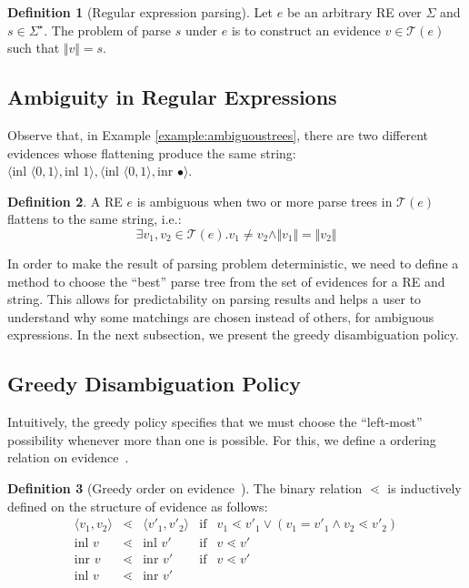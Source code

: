 \documentclass[oneside,12pt]{scrbook}
\theoremstyle{definition}
\theoremstyle{plain}
\theoremstyle{definition}
\newtheorem{Definition}{Definition}
\begin{document}
\begin{Definition}[Regular expression parsing]
   Let $e$ be an arbitrary RE over $\Sigma$ and $s \in \Sigma^\star$. The problem of
   parse $s$ under $e$ is to construct an evidence $v \in \mathcal{T}(e)$ such that
   $\Vert v \Vert = s$.
\end{Definition} 


\subsection{Ambiguity in Regular Expressions}\label{subsection:ambiguity}

Observe that, in Example \ref{example:ambiguoustrees}, there are two different evidences
whose flattening produce the same string:
$\langle \text{inl }\langle 0, 1 \rangle, \text{inl }1 \rangle,\langle \text{inl }\langle 0, 1 \rangle, \text{inr }\bullet \rangle$.

\begin{Definition}
   A RE $e$ is ambiguous when two or more parse trees in $\mathcal{T}(e)$ flattens to the same string, i.e.:
   \[
    \exists v_1, v_2 \in \mathcal{T}(e). v_1 \neq v_2 \land \Vert v_1 \Vert = \Vert v_2 \Vert
   \]
\end{Definition}

In order to make the result of parsing problem deterministic, we need to define a
method to choose the ``best'' parse tree from the set of evidences for a RE and string.
This allows for predictability on parsing results and helps a user to understand
why some matchings are chosen instead of others, for ambiguous expressions.
In the next subsection, we present the greedy disambiguation policy.

\subsection{Greedy Disambiguation Policy}\label{subsubsection:greedypolicy}

Intuitively, the greedy policy specifies that we must choose the ``left-most'' possibility
whenever more than one is possible. For this, we define a ordering relation on evidence~\cite{Frisch2004}.

\begin{Definition}[Greedy order on evidence~\cite{Frisch2004}]
   The binary relation $\lessdot$ is inductively defined on the structure of evidence as follows:
   \[
       \begin{array}{rclll}
          \langle v_1, v_2 \rangle & \lessdot & \langle v'_1, v'_2 \rangle & \text{if} & v_1 \lessdot v'_1 \lor (v_1 = v'_1 \land v_2 \lessdot v'_2)\\
           \text{inl }v & \lessdot & \text{inl }v'              & \text{if} & v \lessdot v' \\
           \text{inr }v & \lessdot & \text{inr }v'               & \text{if} & v \lessdot v' \\
           \text{inl }v & \lessdot & \text{inr }v'               &           & \\
       \end{array}
   \]
\end{Definition}
\end{document}

